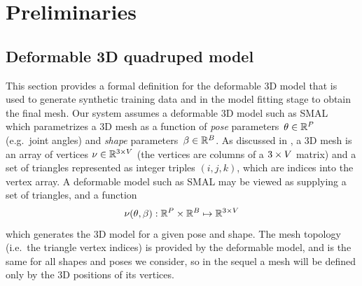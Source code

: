 






\section{Preliminaries}

\subsection{Deformable 3D quadruped model}

This section provides a formal definition for the deformable 3D model that is used to generate synthetic training data and in the model fitting stage to obtain the final mesh. Our system assumes a deformable 3D model such as SMAL~\cite{zuffi2017menagerie} which parametrizes a 3D mesh as a function of {\em pose} parameters~$\theta \in {\mathbb{R}^{P}}$ (e.g.\ joint angles) and {\em shape} parameters~$\beta \in {\mathbb{R}^{B}}$. 
As discussed in , a 3D mesh is an array of vertices $\nu \in {\mathbb{R}^{3 \times V}}$ (the vertices are columns of a $3 \times V$ matrix) and a set of triangles represented as integer triples $(i,j,k)$, which are indices into the vertex array.
A deformable model such as SMAL may be viewed as supplying a set of triangles, and a function
\begin{equation}
\nu(\theta, \beta) : {\mathbb{R}^{P}} \times {\mathbb{R}^{B}} \mapsto {\mathbb{R}^{3 \times V}}
\end{equation}
which generates the 3D model for a given pose and shape.
The mesh topology (i.e.~the triangle vertex indices) is provided by the deformable model, and is the same for all shapes and poses we consider, so in the sequel a mesh will be defined only by the 3D positions of its vertices.

